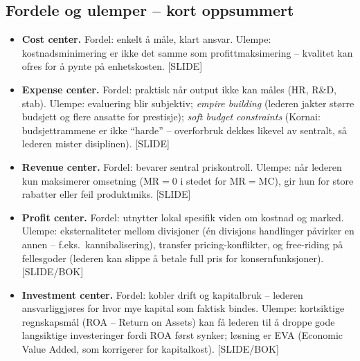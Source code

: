\subsection*{Fordele og ulemper -- kort oppsummert}
\begin{itemize}\setlength{\itemsep}{2pt}
\item \textbf{Cost center.} Fordel: enkelt å måle, klart ansvar. Ulempe: kostnadsminimering er ikke det samme som profittmaksimering -- kvalitet kan ofres for å pynte på enhetskosten. [SLIDE]
\item \textbf{Expense center.} Fordel: praktisk når output ikke kan måles (HR, R\&D, stab). Ulempe: evaluering blir subjektiv; \emph{empire building} (lederen jakter større budsjett og flere ansatte for prestisje); \emph{soft budget constraints} (Kornai: budsjettrammene er ikke ``harde'' -- overforbruk dekkes likevel av sentralt, så lederen mister disiplinen). [SLIDE]
\item \textbf{Revenue center.} Fordel: bevarer sentral priskontroll. Ulempe: når lederen kun maksimerer omsetning (MR$=0$ i stedet for MR$=$MC), gir hun for store rabatter eller feil produktmiks. [SLIDE]
\item \textbf{Profit center.} Fordel: utnytter lokal spesifik viden om kostnad og marked. Ulempe: eksternaliteter mellom divisjoner (én divisjons handlinger påvirker en annen -- f.eks.\ kannibalisering), transfer pricing-konflikter, og free-riding på fellesgoder (lederen kan slippe å betale full pris for konsernfunksjoner). [SLIDE/BOK]
\item \textbf{Investment center.} Fordel: kobler drift og kapitalbruk -- lederen ansvarliggjøres for hvor mye kapital som faktisk bindes. Ulempe: kortsiktige regnskapsmål (ROA -- Return on Assets) kan få lederen til å droppe gode langsiktige investeringer fordi ROA først synker; løsning er EVA (Economic Value Added, som korrigerer for kapitalkost). [SLIDE/BOK]
\end{itemize}

